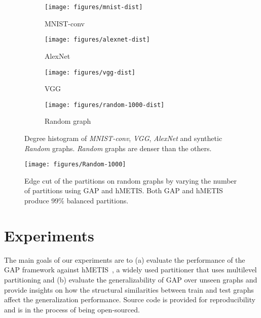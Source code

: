 \documentclass[10pt,twocolumn]{article}
\begin{document}
\begin{figure*}[h]
    \centering
    \begin{subfigure}{0.23\textwidth}
        \texttt{[image: figures/mnist-dist]}
        \caption{\small{MNIST-conv}}
  \label{fig:mnist-dist}
    \end{subfigure}
    \hspace{0.5mm}
    \begin{subfigure}{0.23\textwidth}
        \texttt{[image: figures/alexnet-dist]}
        \caption{\small{AlexNet}}
        \label{fig:alexnet-dist}
    \end{subfigure}
    \hspace{0.5mm}
    \begin{subfigure}{0.23\textwidth}
        \texttt{[image: figures/vgg-dist]}
        \caption{\small{VGG}}
        \label{fig:vgg-dist}
    \end{subfigure}
    \hspace{0.5mm}
    \begin{subfigure}{0.23\textwidth}
        \texttt{[image: figures/random-1000-dist]}
        \caption{\small{Random graph}}
        \label{fig:random-1000-dist}
    \end{subfigure}
\caption{Degree histogram of \textit{MNIST-conv}, \textit{VGG}, \textit{AlexNet} and synthetic \textit{Random} graphs. \textit{Random} graphs are denser than the others.}
    \label{fig:deg-hist}
\end{figure*}

\begin{figure}[h]
\centering
\texttt{[image: figures/Random-1000]}
\caption{Edge cut of the partitions on random graphs by varying the number of partitions using GAP and hMETIS. Both GAP and hMETIS produce 99\% balanced partitions.}
\label{fig:edge_cut_random}
\end{figure}

\section{Experiments}
\label{sec:exp}
The main goals of our experiments are to (a) evaluate the performance of the GAP framework against hMETIS~\cite{karypis_2000}, a widely used partitioner that uses multilevel partitioning and (b) evaluate
the generalizability of GAP over unseen graphs and provide insights on how the structural similarities between train and test graphs affect the generalization performance. Source code is provided for reproducibility and is in the process of being open-sourced.
\end{document}
